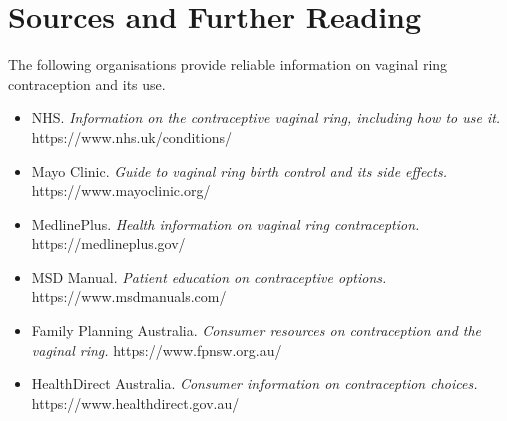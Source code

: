 \section*{Sources and Further Reading}
The following organisations provide reliable information on vaginal ring contraception and its use.

\begin{itemize}
    \item NHS. \textit{Information on the contraceptive vaginal ring, including how to use it.} https://www.nhs.uk/conditions/
    \item Mayo Clinic. \textit{Guide to vaginal ring birth control and its side effects.} https://www.mayoclinic.org/
    \item MedlinePlus. \textit{Health information on vaginal ring contraception.} https://medlineplus.gov/
    \item MSD Manual. \textit{Patient education on contraceptive options.} https://www.msdmanuals.com/
    \item Family Planning Australia. \textit{Consumer resources on contraception and the vaginal ring.} https://www.fpnsw.org.au/
    \item HealthDirect Australia. \textit{Consumer information on contraception choices.} https://www.healthdirect.gov.au/
\end{itemize}
